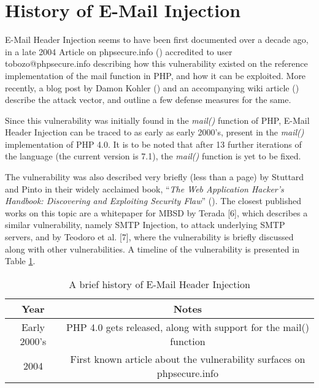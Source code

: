 \section{History of E-Mail Injection}

E-Mail Header Injection seems to have been first documented over a decade ago, in a late 2004 Article on phpsecure.info (\cite{Tobozo}) accredited to user tobozo@phpsecure.info describing how this vulnerability existed on the reference implementation of the mail function in PHP, and how it can be exploited. More recently, a blog post by Damon Kohler (\cite{DK}) and an accompanying wiki article (\cite{Injection}) describe the attack vector, and outline a few defense measures for the same.

Since this vulnerability was initially found in the \emph{mail()} function of PHP, E-Mail Header Injection can be traced to as early as early 2000's, present in the \emph{mail()} implementation of PHP 4.0. It is to be noted that after 13 further iterations of the language (the current version is 7.1), the \emph{mail()} function is yet to be fixed.

The vulnerability was also described very briefly (less than a page) by Stuttard and Pinto in their widely acclaimed book, ``\emph{The Web Application Hacker's Handbook: Discovering and Exploiting Security Flaw}'' (\cite{stuttard2011web}). 
The closest published works on this topic are a whitepaper for MBSD by Terada [6], which describes a similar vulnerability, namely SMTP Injection, to attack underlying SMTP servers, and by Teodoro et al. [7], where the vulnerability is briefly discussed along with other vulnerabilities.
A timeline of the vulnerability is presented in Table \ref{tab:history}.

\begin{table}[!htbp]
	\centering
	\begin{tabular}{|c|c|}
		\hline
		Year & Notes\\
		\hline
		{Early 2000's} & {PHP 4.0 gets released, along with support for the mail() function}\\
		\hline
		{2004} & {First known article about the vulnerability surfaces on phpsecure.info}\\
		\hline		
	\end{tabular}
	\caption{A brief history of E-Mail Header Injection}
	\label{tab:history}
\end{table}